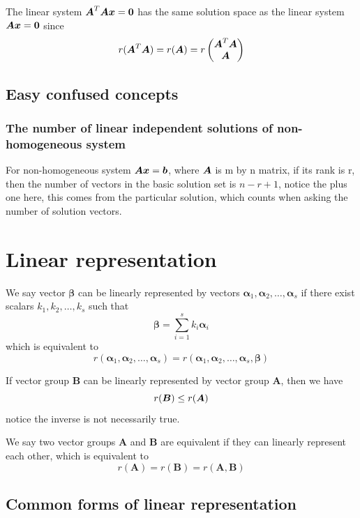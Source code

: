 \documentclass{overview}
\begin{document}
The linear system $\boldsymbol{A}^{T}\boldsymbol{A}\boldsymbol{x}=\boldsymbol{0}$ has the same solution space as
the linear system $\boldsymbol{A}\boldsymbol{x}=\boldsymbol{0}$ since
\[
	r(\boldsymbol{A}^{T}\boldsymbol{A}) = r(\boldsymbol{A}) = r\begin{pmatrix} \boldsymbol{A}^{T}\boldsymbol{A} \\ \boldsymbol{A} \end{pmatrix}
\]

\subsection{Easy confused concepts}

\subsubsection{The number of linear independent solutions of non-homogeneous system}

For non-homogeneous system $\boldsymbol{A} \boldsymbol{x}=\boldsymbol{b}$, where $\boldsymbol{A}$ is
m by n matrix, if its rank is r, then the number of vectors in the basic solution set
is $n-r+1$, notice the plus one here, this comes from the particular solution, 
which counts when asking the number of solution vectors.

\section{Linear representation}

We say vector $\boldsymbol{\beta}$ can be linearly represented by vectors 
$\boldsymbol{\alpha}_1, \boldsymbol{\alpha}_2, \dots, \boldsymbol{\alpha}_s$
if there exist scalars $k_1, k_2, \dots, k_s$ such that
\[
	\boldsymbol{\beta} = \sum_{i=1}^{s} k_i \boldsymbol{\alpha}_i
\]
which is equivalent to
\[
	 r(\boldsymbol{\alpha}_1, \boldsymbol{\alpha}_2, \dots, \boldsymbol{\alpha}_s)
	= r(\boldsymbol{\alpha}_1, \boldsymbol{\alpha}_2, \dots, \boldsymbol{\alpha}_s, \boldsymbol{\beta})
\]

If vector group $\boldsymbol{B}$ can be linearly represented by vector group $\boldsymbol{A}$,
then we have
\[
	r(\boldsymbol{B}) \leq r(\boldsymbol{A}) \\
\]
notice the inverse is not necessarily true.

We say two vector groups $\boldsymbol{A}$ and $\boldsymbol{B}$ are equivalent if 
they can linearly represent each other, which is equivalent to
\[
	r(\boldsymbol{A}) = r(\boldsymbol{B}) = r(\boldsymbol{A}, \boldsymbol{B})
\]

\subsection{Common forms of linear representation}
\end{document}

